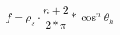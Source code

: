 \begin{equation}
    f = { \rho_{s} } \cdot { \frac{n+2}{2*\pi} } * {\cos^{n}{\theta_{h}}}
\end{equation}